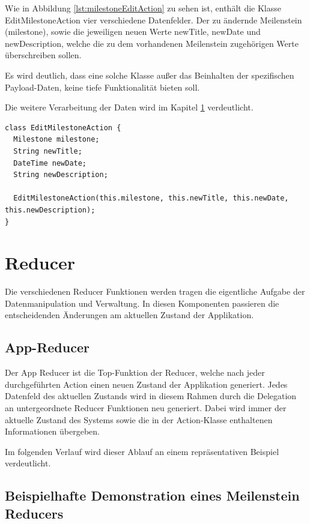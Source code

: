 \documentclass[bibliography=totoc,listof=totoc,BCOR=5mm,DIV=12,oneside]{scrbook}
\begin{document}
\par Wie in Abbildung \ref{lst:milestoneEditAction} zu sehen ist, enthält die Klasse EditMilestoneAction vier verschiedene Datenfelder. 
Der zu ändernde Meilenstein (milestone), sowie die jeweiligen neuen Werte newTitle, newDate und newDescription, welche die zu dem vorhandenen Meilenstein zugehörigen Werte überschreiben sollen.
\par Es wird deutlich, dass eine solche Klasse außer das Beinhalten der spezifischen Payload-Daten, keine tiefe Funktionalität bieten soll. 
\par Die weitere Verarbeitung der Daten wird im Kapitel \ref{sec:reducer} verdeutlicht.

\bigskip
\begin{lstlisting}[caption={Meilenstein Action Beispiel},captionpos=b, label=lst:milestoneEditAction]
class EditMilestoneAction {
  Milestone milestone;
  String newTitle;
  DateTime newDate;
  String newDescription;

  EditMilestoneAction(this.milestone, this.newTitle, this.newDate, this.newDescription);
}
\end{lstlisting}
\bigskip


\newpage
\section{Reducer}
\label{sec:reducer}
\par Die verschiedenen Reducer Funktionen werden tragen die eigentliche Aufgabe der Datenmanipulation und Verwaltung. In diesen Komponenten passieren die entscheidenden Änderungen am aktuellen Zustand der Applikation.

\subsection{App-Reducer}
\par Der App Reducer ist die Top-Funktion der Reducer, welche nach jeder durchgeführten Action einen neuen Zustand der Applikation generiert. Jedes Datenfeld des aktuellen Zustands wird in diesem Rahmen durch die Delegation an untergeordnete Reducer Funktionen neu generiert. Dabei wird immer der aktuelle Zustand des Systems sowie die in der Action-Klasse enthaltenen Informationen übergeben.
\par \medskip Im folgenden Verlauf wird dieser Ablauf an einem repräsentativen Beispiel verdeutlicht.

\subsection{Beispielhafte Demonstration eines Meilenstein Reducers}
\end{document}
